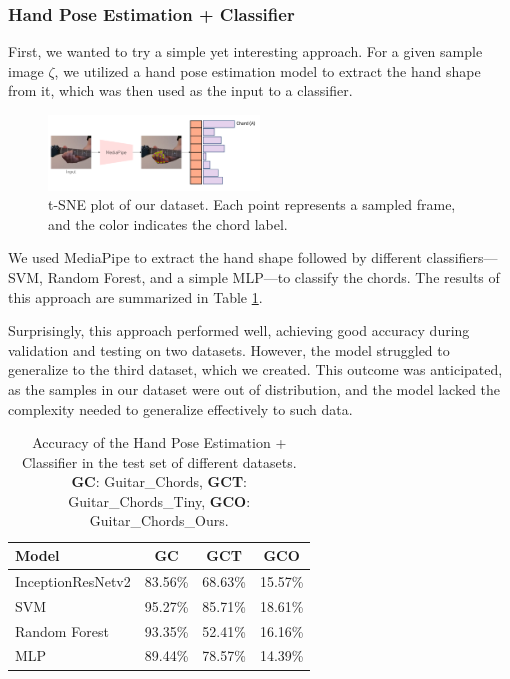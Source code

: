 \documentclass[10pt,twocolumn,letterpaper]{article}
\begin{document}
\subsubsection{Hand Pose Estimation + Classifier}
First, we wanted to try a simple yet interesting approach. For a given sample image $\zeta$, we utilized a hand pose estimation model to extract the hand shape from it, which was then used as the input to a classifier.

\begin{figure}[h]
  \centering
  \includegraphics[width=0.5\textwidth]{images/final/hand_pose_estimation_classifier.png}
  \caption{t-SNE plot of our dataset. Each point represents a sampled frame, and the color indicates the chord label. }
  \label{fig:ours-tsne-plot}
\end{figure}

We used MediaPipe \cite{zhang2020mediapipe} to extract the hand shape followed by different classifiers—SVM, Random Forest, and a simple MLP—to classify the chords. The results of this approach are summarized in Table \ref{tab:handpose-classifier-results}.

Surprisingly, this approach performed well, achieving good accuracy during validation and testing on two datasets. However, the model struggled to generalize to the third dataset, which we created. This outcome was anticipated, as the samples in our dataset were out of distribution, and the model lacked the complexity needed to generalize effectively to such data.


\begin{table}[h]
  \centering
  \begin{tabular}{lccc}
    \toprule
    \textbf{Model} & \textbf{GC} & \textbf{GCT} & \textbf{GCO} \\
    \midrule
 InceptionResNetv2 & 83.56\% & 68.63\% & 15.57\% \\
    \midrule
 SVM & 95.27\% & 85.71\% & 18.61\% \\
 Random Forest & 93.35\% & 52.41\% & 16.16\%  \\
 MLP & 89.44\% & 78.57\% & 14.39\% \\
    \bottomrule
  \end{tabular}
  \caption{Accuracy of the Hand Pose Estimation + Classifier in the test set of different datasets. \textbf{GC}: Guitar\_Chords, \textbf{GCT}: Guitar\_Chords\_Tiny, \textbf{GCO}: Guitar\_Chords\_Ours.}
  \label{tab:handpose-classifier-results}
\end{table}
\end{document}
